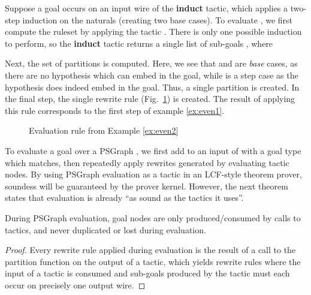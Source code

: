 \documentclass{llncs}
\begin{document}
\begin{example} \label{ex:even2}
Suppose a goal  occurs on an input wire of the \textbf{induct} tactic, which applies a two-step induction on the naturals (creating two base cases). To evaluate , we first compute the ruleset  by applying the tactic . There is only one possible induction to perform, so the \textbf{induct} tactic returns a single list of sub-goals , where

\end{example}



\noindent Next, the set of partitions  is computed. Here, we see that  and  are \textit{base}
cases, as there are no hypothesis which can embed in the goal, while  is a step case as the hypothesis does indeed embed 
in the goal. Thus, a single partition  is created. In the final step, the single rewrite rule (Fig.~\ref{fig:eval-ex}) is created. The result of applying this rule corresponds to the first step of example \ref{ex:even1}.

\begin{figure}\centering
  \vspace{-20pt}
  \caption{Evaluation rule from Example \ref{ex:even2}}\label{fig:eval-ex}
  \vspace{-10pt}
\end{figure}

To evaluate a goal  over a PSGraph , we first add  to an input of  with a goal type which  matches, then repeatedly apply rewrites generated by evaluating tactic nodes. By using PSGraph evaluation as a tactic in an LCF-style theorem prover, soundess will be guaranteed by the prover kernel. However, the next theorem states that evaluation is already ``as sound as the tactics it uses''.

\begin{theorem}[Soundness] \label{thm:soundness}
During PSGraph evaluation, goal nodes are only produced/consumed by calls to tactics, and never duplicated or lost during evaluation.
\end{theorem}

\begin{proof}
  Every rewrite rule applied during evaluation is the result of a call to the partition function  on the output of a tactic, which yields rewrite rules where the input of a tactic is consumed and sub-goals produced by the tactic must each occur on precisely one output wire.
\end{proof}
\end{document}
